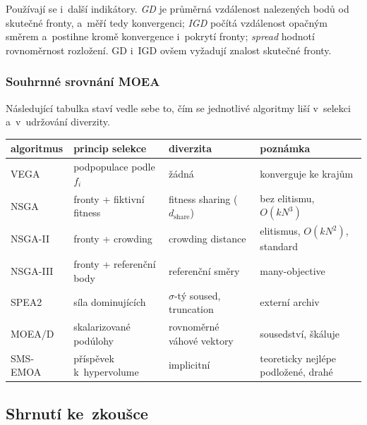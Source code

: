 \documentclass[11pt,a4paper]{article}
\theoremstyle{definition}
\begin{document}
Používají se i~další indikátory. \emph{GD} je průměrná vzdálenost nalezených bodů od
skutečné fronty, a~měří tedy konvergenci; \emph{IGD} počítá vzdálenost opačným směrem
a~postihne kromě konvergence i~pokrytí fronty; \emph{spread} hodnotí rovnoměrnost
rozložení. GD i~IGD ovšem vyžadují znalost skutečné fronty.

\subsubsection{Souhrnné srovnání MOEA}

Následující tabulka staví vedle sebe to, čím se jednotlivé algoritmy liší v~selekci
a~v~udržování diverzity.

\begin{center}
\small
\begin{tabular}{@{}llll@{}}
\toprule
\textbf{algoritmus} & \textbf{princip selekce} & \textbf{diverzita} & \textbf{poznámka} \\
\midrule
VEGA & podpopulace podle $f_i$ & žádná & konverguje ke krajům \\
NSGA & fronty + fiktivní fitness & fitness sharing ($d_{\mathrm{share}}$) & bez elitismu, $O(kN^3)$ \\
NSGA-II & fronty + crowding & crowding distance & elitismus, $O(kN^2)$, standard \\
NSGA-III & fronty + referenční body & referenční směry & many-objective \\
SPEA2 & síla dominujících & $\sigma$-tý soused, truncation & externí archiv \\
MOEA/D & skalarizované podúlohy & rovnoměrné váhové vektory & sousedství, škáluje \\
SMS-EMOA & příspěvek k~hypervolume & implicitní & teoreticky nejlépe podložené, drahé \\
\bottomrule
\end{tabular}
\end{center}

\subsection{Shrnutí ke~zkoušce}
\end{document}
